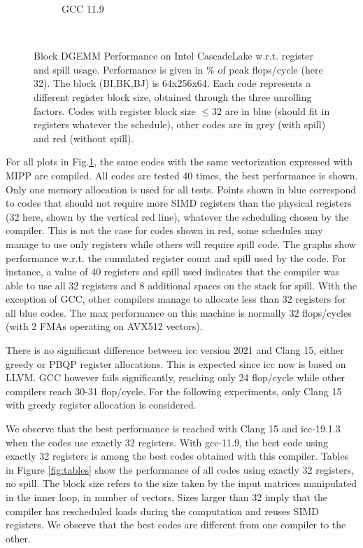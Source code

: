 \documentclass{article}
\begin{document}
\begin{figure}[h!]
\begin{subfigure}[h]{0.45\textwidth}
  \caption{GCC 11.9}
  \end{subfigure}\hfill ~
  \caption{Block DGEMM Performance on Intel CascadeLake w.r.t. register and spill usage. Performance is given in \% of peak flops/cycle (here 32). The block (BI,BK,BJ) is 64x256x64. Each code represents a different register block size, obtained through the three unrolling factors. Codes with register block size $\leq 32$ are in blue (should fit in registers whatever the schedule), other codes are in grey (with spill) and red (without spill).  \label{fig:cascadelake}}
\end{figure}
 For all plots in Fig.\ref{fig:cascadelake}, the same codes with the same vectorization expressed with MIPP are
compiled. All codes are tested 40 times, the best performance is shown. Only one memory allocation is used for all tests. Points shown in blue correspond to codes that should not require
more SIMD registers than the physical registers (32 here, shown by the vertical red line), whatever
the scheduling chosen by the compiler. This is not the case for codes
shown in red, some schedules may manage to use only registers while
others will require spill code. The graphs show performance w.r.t. the
cumulated register count and spill used by the code. For instance, a value of 40 registers and
spill used indicates that the compiler was able to use all 32
registers and 8 additional spaces on the stack for spill. With the exception of
GCC, other compilers manage to allocate less than 32 registers for all
blue codes. The max performance on this machine is normally 32 flops/cycles (with 2 FMAs operating on AVX512 vectors).  

There is no significant difference between icc version 2021 and Clang
15, either greedy or PBQP register allocations. This is expected since
icc now is based on LLVM. GCC however fails significantly, reaching
only 24 flop/cycle while other compilers reach 30-31 flop/cycle.  For
the following experiments, only Clang 15 with greedy register
allocation is considered.

We observe that the best performance is reached with Clang 15 and
icc-19.1.3 when the codes use exactly 32 registers. With gcc-11.9, the
best code using exactly 32 registers is among the best codes obtained
with this compiler.  Tables in Figure \ref{fig:tables} show the
performance of all codes using exactly 32 registers, no spill. The
block size refers to the size taken by the input matrices manipulated
in the inner loop, in number of vectors. Sizes larger than 32 imply that the compiler has rescheduled loads during the computation and reuses SIMD registers. We observe that the best codes are different from one compiler to the other. 
\end{document}
